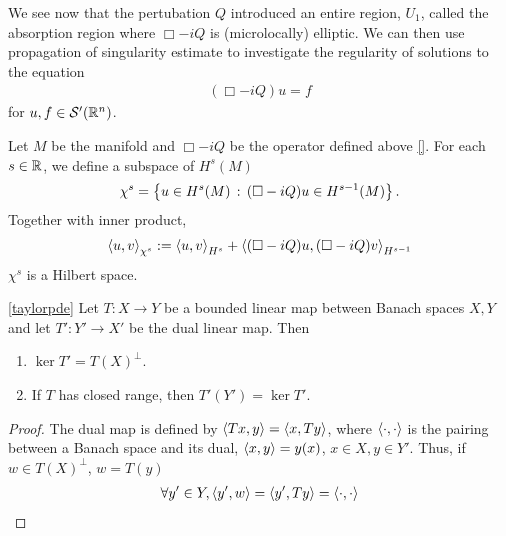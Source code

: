 \documentclass[12pt]{article}
\begin{document}
We see now that the pertubation $Q$ introduced an entire region, $U_1$, called the absorption region where $\Box - iQ$ is (microlocally) elliptic. We can then use propagation of singularity estimate to investigate the regularity of solutions to the equation
\begin{align*}
(\Box - iQ) u = f
\end{align*}
for $u, f \in \sch'(\R^n)$. \\


\begin{fdefinition}
    Let $M$ be the manifold and $\Box -i Q$ be the operator defined above \ref{}. For each $s \in \R$, we define a subspace of $H^{s}(M)$ 
    \begin{align*}
    \chi^s = \set{u \in H^s(M) \wh (\Box - i Q)u \in H^{s - 1}(M)}. 
    \end{align*}
    Together with inner product, 
    \begin{align*}
    \inprod[u, v]_{\chi^s} := \inprod[u, v]_{H^{s}} + \inprod[(\Box - iQ)u, (\Box - iQ)v]_{H^{s -1}}
    \end{align*}
    $\chi^s$ is a Hilbert space. 
\end{fdefinition}



\begin{flemma} \ref{taylorpde}
    Let $T: X \to Y$ be a bounded linear map between Banach spaces $X, Y$ and let $T' : Y' \to X'$ be the dual linear map. Then
    \begin{enumerate}
        \item $\ker T' = T(X)^\perp$. 
        \item If $T$ has closed range, then $T'(Y')  =\ker T'$.  
    \end{enumerate}
\end{flemma}
\begin{proof}
    The dual map is defined by $\inprod[Tx, y] = \inprod[x, Ty]$, where $\inprod $ is the pairing between a Banach space and its dual, $\inprod[x, y] = y(x)$, $x \in X, y \in Y'$. Thus, if $w \in T(X)^\perp$, $w = T(y)$
    \begin{align*}
    \forall y' \in Y, \inprod[y', w] = \inprod[y', Ty] = \inprod
    \end{align*}

\end{proof}
\end{document}
